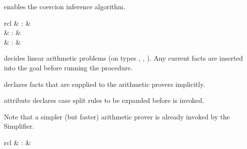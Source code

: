 \begin{isabellebody}
\begin{isamarkuptext}
\begin{description}
  \item \hyperlink{attribute.HOL.coercion-enabled}{\mbox{}} enables the coercion
  inference algorithm.

  \end{description}%
\end{isamarkuptext}%
\isamarkuptrue%
%
\isamarkuptrue%
%
\begin{isamarkuptext}%
\begin{matharray}{rcl}
    \hypertarget{method.HOL.arith}{\hyperlink{method.HOL.arith}{\mbox{}}} & : &  \\
    \hypertarget{attribute.HOL.arith}{\hyperlink{attribute.HOL.arith}{\mbox{}}} & : &  \\
    \hypertarget{attribute.HOL.arith-split}{\hyperlink{attribute.HOL.arith-split}{\mbox{}}} & : &  \\
  \end{matharray}

  \begin{description}

  \item \hyperlink{method.HOL.arith}{\mbox{}} decides linear arithmetic problems (on
  types , , ).  Any current facts
  are inserted into the goal before running the procedure.

  \item \hyperlink{attribute.HOL.arith}{\mbox{}} declares facts that are supplied to
  the arithmetic provers implicitly.

  \item \hyperlink{attribute.HOL.arith-split}{\mbox{}} attribute declares case split
  rules to be expanded before \hyperlink{method.HOL.arith}{\mbox{}} is invoked.

  \end{description}

  Note that a simpler (but faster) arithmetic prover is already
  invoked by the Simplifier.%
\end{isamarkuptext}%
\isamarkuptrue%
%
\isamarkuptrue%
%
\begin{isamarkuptext}%
\begin{matharray}{rcl}
    \hypertarget{method.HOL.iprover}{\hyperlink{method.HOL.iprover}{\mbox{}}} & : &  \\
  \end{matharray}


\end{isamarkuptext}
\end{isabellebody}
